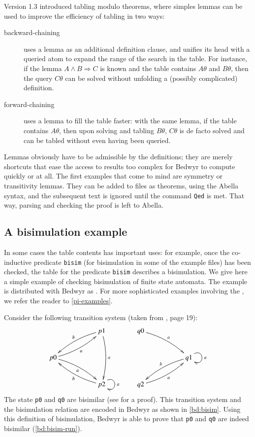 Version 1.3 introduced tabling modulo theorems, where simples lemmas can
be used to improve the efficiency of tabling in two ways:
\begin{description}
  \item[backward-chaining] uses a lemma as an additional definition
    clause, and unifies its head with a queried atom to expand the range
    of the search in the table.  For instance, if the lemma $A\land
    B\Rightarrow C$ is known and the table contains $A\theta$ and
    $B\theta$, then the query $C\theta$ can be solved without unfolding
    a (possibly complicated) definition.

  \item[forward-chaining] uses a lemma to fill the table faster: with
    the same lemma, if the table contains $A\theta$, then upon solving
    and tabling $B\theta$, $C\theta$ is de facto solved and can be
    tabled without even having been queried.
\end{description}

Lemmas obviously have to be admissible by the definitions; they are
merely shortcuts that ease the access to results too complex for Bedwyr
to compute quickly or at all.  The first examples that come to mind are
symmetry or transitivity lemmas.  They can be added to files as
theorems, using the Abella syntax, and the subsequent text is ignored
until the command \lstinline{Qed} is met.  That way, parsing and
checking the proof is left to Abella.

\subsection{A bisimulation example}

In some cases the table contents has important uses: for example, once
the co-inductive predicate \lstinline+bisim+ (for bisimulation in some
of the example files) has been checked, the table for the predicate
\lstinline+bisim+ describes a bisimulation.  We give here a simple
example of checking bisimulation of finite state automata.  The example
is distributed with Bedwyr as .  For more sophisticated
examples involving the \pc{}, we refer the reader to
\autoref{pi-examples}.

Consider the following transition system (taken from
\cite{milner99book}, page 19):
\[\xymatrix
   {&  & p1 \ar@/_/[lld]_b \ar@/^/[dd]^a \\
    p0 \ar@/_/[rru]_a \ar@/^/[rrd]_a \\
    & & p2 \ar@(ur,dr)^a \ar@/^/[llu]^b}
  \qquad
  \xymatrix
   {q0 \ar@/^/[rrd]^a \\
    & & q1 \ar@(ur,dr)^a \ar@/_/[dll]_b \\
    q2 \ar@/_/[rru]_a}
\]
The state \lstinline+p0+ and \lstinline+q0+ are bisimilar (see
\cite{milner99book} for a proof).  This transition system and the
bisimulation relation are encoded in Bedwyr as shown in
\autoref{bd:bisim}.  Using this definition of bisimulation, Bedwyr is
able to prove that \lstinline+p0+ and \lstinline+q0+ are indeed
bisimilar (\autoref{bd:bisim-run}).

